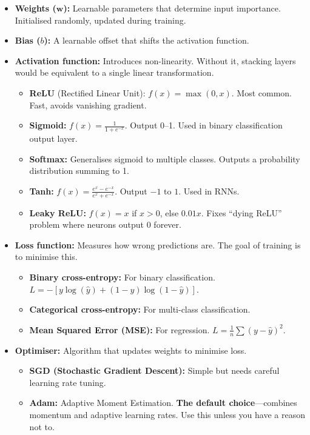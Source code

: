 \documentclass[12pt, a4paper, oneside]{book}
\begin{document}
\begin{itemize}[leftmargin=2em]
    \item \textbf{Weights ($\mathbf{w}$):} Learnable parameters that determine input importance. Initialised randomly, updated during training.
    \item \textbf{Bias ($b$):} A learnable offset that shifts the activation function.
    \item \textbf{Activation function:} Introduces non-linearity. Without it, stacking layers would be equivalent to a single linear transformation.
    \begin{itemize}
        \item \textbf{ReLU} (Rectified Linear Unit): $f(x) = \max(0, x)$. Most common. Fast, avoids vanishing gradient.
        \item \textbf{Sigmoid:} $f(x) = \frac{1}{1 + e^{-x}}$. Output 0--1. Used in binary classification output layer.
        \item \textbf{Softmax:} Generalises sigmoid to multiple classes. Outputs a probability distribution summing to 1.
        \item \textbf{Tanh:} $f(x) = \frac{e^x - e^{-x}}{e^x + e^{-x}}$. Output $-1$ to $1$. Used in RNNs.
        \item \textbf{Leaky ReLU:} $f(x) = x$ if $x > 0$, else $0.01x$. Fixes ``dying ReLU'' problem where neurons output 0 forever.
    \end{itemize}
    \item \textbf{Loss function:} Measures how wrong predictions are. The goal of training is to minimise this.
    \begin{itemize}
        \item \textbf{Binary cross-entropy:} For binary classification. $L = -[y \log(\hat{y}) + (1-y)\log(1-\hat{y})]$.
        \item \textbf{Categorical cross-entropy:} For multi-class classification.
        \item \textbf{Mean Squared Error (MSE):} For regression. $L = \frac{1}{n}\sum(y - \hat{y})^2$.
    \end{itemize}
    \item \textbf{Optimiser:} Algorithm that updates weights to minimise loss.
    \begin{itemize}
        \item \textbf{SGD (Stochastic Gradient Descent):} Simple but needs careful learning rate tuning.
        \item \textbf{Adam:} Adaptive Moment Estimation. \textbf{The default choice}---combines momentum and adaptive learning rates. Use this unless you have a reason not to.

\end{itemize}
\end{itemize}
\end{document}
